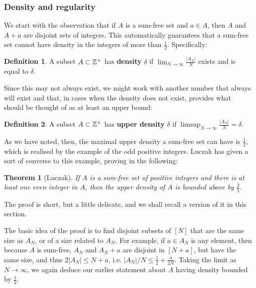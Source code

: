 \documentclass{article}
\newtheorem{theorem}{Theorem}[section]
\theoremstyle{definition}
\newtheorem{definition}{Definition}
\theoremstyle{remark}
\numberwithin{equation}{section}
\begin{document}
\subsubsection{Density and regularity}

We start with the observation that if $A$ is a sum-free set and
$a \in A$, then $A$ and $A+a$ are disjoint sets of integers.  This
automatically guarantees that a sum-free set cannot have density in
the integers of more than $\frac12$.  Specifically: 

\begin{definition}
  A subset $A \subset \mathbb{Z}^+$ has \textbf{density} $\delta$ if
  $\lim_{N \to \infty} \frac{|A_N|}{N}$ exists and is equal to
  $\delta$.
\end{definition}

Since this may not always exist, we might work with another number
that always will exist and that, in cases when the density does not
exist, provides what should be thought of as at least an upper bound: 

\begin{definition}
  A subset $A \subset \mathbb{Z}^+$ has \textbf{upper density} $\delta$ if
  $\limsup_{N \to \infty}\frac{|A_N|}{N} = \delta$.
\end{definition}

As we have noted, then, the maximal upper density a sum-free set can
have is $\frac12$, which is realised by the example of the odd
positive integers.  Luczak has given a sort of converse to this
example, proving in \cite{sumfree_regularity_luczak} the following: 

\begin{theorem}[Luczak]
If $A$ is a sum-free set of positive integers and there is at least
one even integer in $A$, then the upper density of $A$ is bounded
above by $\frac25$.  
\end{theorem}  

The proof is short, but a
little delicate, and we shall recall a version of it in this section.

The basic idea of the proof is to find disjoint subsets of $[N]$ that
are the same size as $A_N$, or of a size related to $A_N$.  For
example, if $a \in A_N$ is any element, then because $A$ is sum-free,
$A_N$ and $A_N+a$ are disjoint in $[N+a]$, but have the same size, and
thus $2|A_N| \leq N+a$, i.e. $|A_N|/N \leq \frac12 + \frac{a}{2N}$.
Taking the limit as $N \to \infty$, we again deduce our earlier
statement about $A$ having density bounded by $\frac12$.
\end{document}
